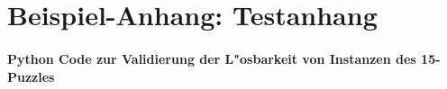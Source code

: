 \chapter{Beispiel-Anhang: Testanhang}


\subsubsection{Python Code zur Validierung der L"osbarkeit von Instanzen des 15-Puzzles}
\label{ssec:appendix-latency-benchmark}
\begin{lstlisting}[caption={Python Code zur Validierung der L"osbarkeit von Instanzen des 15-Puzzles}, label={code:validate-15-puzzle:py}]
\end{lstlisting}
\inputminted[linenos,breaklines,breakanywhere]{python}{../code/15-solvable-v1.py}
\newpage
